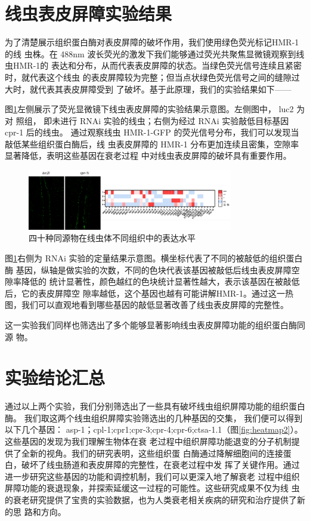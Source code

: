 \section{线虫表皮屏障实验结果}

为了清楚展示组织蛋白酶对表皮屏障的破坏作用，我们使用绿色荧光标记HMR-1的线 虫株。在 488nm 波长荧光的激发下我们能够通过荧光共聚焦显微镜观察到线虫HMR-1的  表达和分布，从而代表表皮屏障的状态。当绿色荧光信号连续且紧密时，就代表这个线虫 的表皮屏障较为完整；但当点状绿色荧光信号之间的缝隙过大时，就代表其表皮屏障受到  了破坏。基于此原理，我们的实验结果如下——

图\ref{fig:fluorescence}左侧展示了荧光显微镜下线虫表皮屏障的实验结果示意图。左侧图中， luc2 为对  照组， 即未进行 RNAi 实验的线虫；右侧为经过 RNAi 实验敲低目标基因 cpr-1 后的线虫。 通过观察线虫 HMR-1-GFP 的荧光信号分布，我们可以发现当敲低某些组织蛋白酶后，线  虫表皮屏障的 HMR-1 分布更加连续且密集，空隙率显著降低，表明这些基因在衰老过程  中对线虫表皮屏障的破坏具有重要作用。

\begin{figure}[H]
    \centering
    \includegraphics[width=0.8\textwidth]{img/fluorescence.png}
    \caption{四十种同源物在线虫体不同组织中的表达水平}
    \label{fig:fluorescence}
\end{figure}

图\ref{fig:fluorescence}右侧为 RNAi 实验的定量结果示意图。横坐标代表了不同的被敲低的组织蛋白酶 基因，纵轴是做实验的次数，不同的色块代表该基因被敲低后线虫表皮屏障空隙率降低的 统计显著性，颜色越红的色块统计显著性越大，表示该基因在被敲低后，它的表皮屏障空 隙率越低，这个基因也越有可能讲解HMR-1。通过这一热图，我们可以直观地看到哪些基因的敲低显著改善了线虫表皮屏障的完整性。

这一实验我们同样也筛选出了多个能够显著影响线虫表皮屏障功能的组织蛋白酶同源 物。

\section{实验结论汇总}

通过以上两个实验，我们分别筛选出了一些具有破坏线虫组织屏障功能的组织蛋白酶。 我们取这两个线虫组织屏障实验筛选出的几种基因的交集， 我们便可以得到以下几个基因： asp-1；cpl-1;cpr1;cpr-3;cpr-4;cpr-6;ctsa-1.1（图\ref{fig:heatmap2}）。这些基因的发现为我们理解生物体在衰  老过程中组织屏障功能退变的分子机制提供了全新的视角。我们的研究表明，这些组织蛋  白酶通过降解细胞间的连接蛋白，破坏了线虫肠道和表皮屏障的完整性，在衰老过程中发  挥了关键作用。通过进一步研究这些基因的功能和调控机制，我们可以更深入地了解衰老  过程中组织屏障功能的衰退现象，并探索延缓这一过程的可能性。这些研究成果不仅为线  虫的衰老研究提供了宝贵的实验数据，也为人类衰老相关疾病的研究和治疗提供了新的思  路和方向。


